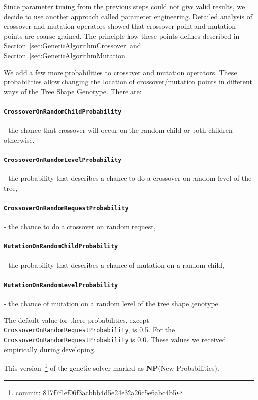 Since parameter tuning from the previous steps could not give valid results, we decide to use another approach called parameter engineering.
Detailed analysis of crossover and mutation operators showed that crossover point and mutation points are coarse-grained. The principle how these points defines described in Section~\ref{sec:GeneticAlgorithmCrossover} and Section~\ref{sec:GeneticAlgorithmMutation}.

We add a few more probabilities to crossover and mutation operators. These probabilities allow changing the location of crossover/mutation points in different ways of the Tree Shape Genotype.
There are:
	\paragraph{\texttt{CrossoverOnRandomChildProbability}} - the chance that crossover will occur on the random child or both children otherwise.
	\paragraph{\texttt{CrossoverOnRandomLevelProbability}} - the probability that describes a chance to do a crossover on random level of the tree, 
	\paragraph{\texttt{CrossoverOnRandomRequestProbability}} - the chance to do a crossover on random request,
	\paragraph{\texttt{MutationOnRandomChildProbability}} - the probability that describes a chance of mutation on a random child,
	\paragraph{\texttt{MutationOnRandomLevelProbability}} - the chance of mutation on a random level of the tree shape genotype.
	
The default value for there probabilities, except \texttt{CrossoverOnRandomRequestProbability}, is 0.5. For the \texttt{CrossoverOnRandomRequestProbability} is 0.0. These values we received empirically during developing.

This version~\footnote{commit: \href{https://git-st.inf.tu-dresden.de/mquat/mquat2/commit/817f7f1ef06f3acbbb4d5e24e32a26c5e6abc4b5}{817f7f1ef06f3acbbb4d5e24e32a26c5e6abc4b5}} of the genetic solver marked as \textbf{NP}(New Probabilities).

